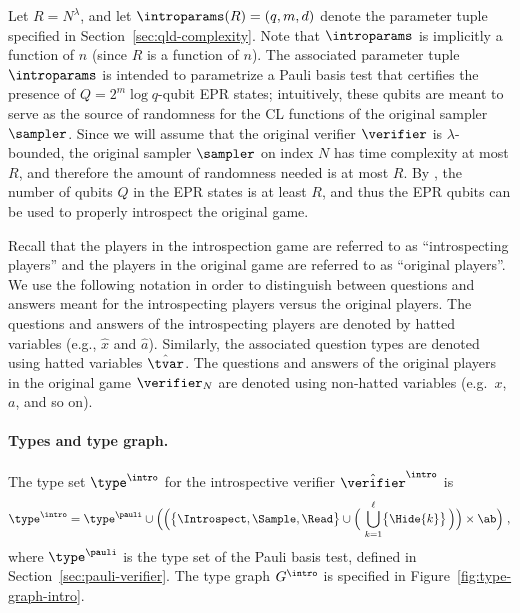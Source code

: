 Let $R = N^\lambda$, and let $\introparams(R) =
(q,m,d)$ denote the parameter tuple specified in
Section~\ref{sec:qld-complexity}.
Note that $\introparams$ is implicitly a function of $n$ (since $R$ is a
function of $n$).
The associated parameter tuple $\introparams$ is intended to parametrize a Pauli
basis test that certifies the  presence of $Q = 2^m \log q$-qubit EPR states; intuitively, these qubits are meant to serve as the source of randomness for the CL functions of the
original sampler $\sampler$. Since we will assume that the original verifier $\verifier$ is $\lambda$-bounded, the original sampler $\sampler$ on index $N$ has time complexity at most $R$, and therefore the amount of randomness needed is at most $R$. By , the number of qubits $Q$ in the EPR states is at least $R$, and thus the EPR qubits can be used to properly introspect the original game. 

Recall that the players in the introspection game are referred to as
``introspecting players'' and the players in the original game are referred to
as ``original players''.
We use the following notation in order to distinguish between questions and
answers meant for the introspecting players versus the original players.
The questions and answers of the introspecting players are denoted by hatted
variables (e.g., $\hat{x}$ and $\hat{a}$).
Similarly, the associated question types are denoted using hatted variables
$\hat{\tvar}$.
The questions and answers of the original players in the original game
$\verifier_N$ are denoted using non-hatted variables (e.g.\ $x$, $a$, and so
on).

\paragraph{Types and type graph.}
The type set $\type^\intro$ for the introspective verifier $\tvint$ is
\begin{gather*}
  \type^\intro = \type^\pauli \cup \Big( \Big(\big\{ \Introspect, \Sample,
  \Read \big\} \cup \Big(\, \bigcup_{k=1}^{\ell} \bigl\{ \Hide{k} \bigr\} \,
  \Big) \Big) \times \ab \Big) \;,
\end{gather*}
where $\type^\pauli$ is the type set of the Pauli basis test, defined in
Section~\ref{sec:pauli-verifier}.
The type graph $G^\intro$ is specified in Figure~\ref{fig:type-graph-intro}.

